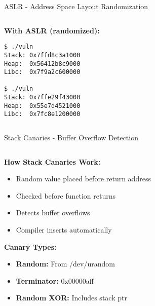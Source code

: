 \documentclass[aspectratio=169,12pt]{beamer}
\begin{document}
\begin{frame}[fragile]{ASLR - Address Space Layout Randomization}
\begin{columns}
\begin{column}{0.5\textwidth}
            \begin{tcolorbox}[colback=green!10]
                \small
                \textbf{With ASLR (randomized):}
                \begin{verbatim}
$ ./vuln
Stack: 0x7ffd8c3a1000
Heap:  0x56412b8c9000
Libc:  0x7f9a2c600000

$ ./vuln
Stack: 0x7ffe29f43000
Heap:  0x55e7d4521000
Libc:  0x7fc8e1200000
                \end{verbatim}
            \end{tcolorbox}
        \end{column}
    \end{columns}
\end{frame}

\begin{frame}[fragile]{Stack Canaries - Buffer Overflow Detection}
    \begin{columns}
        \begin{column}{0.5\textwidth}
            \textbf{How Stack Canaries Work:}
            \begin{itemize}
                \item Random value placed before return address
                \item Checked before function returns
                \item Detects buffer overflows
                \item Compiler inserts automatically
            \end{itemize}
            
            \vspace{0.3cm}
            \textbf{Canary Types:}
            \begin{itemize}
                \item \textbf{Random:} From /dev/urandom
                \item \textbf{Terminator:} 0x00000aff
                \item \textbf{Random XOR:} Includes stack ptr
            \end{itemize}
            

\end{column}
\end{columns}
\end{frame}
\end{document}
